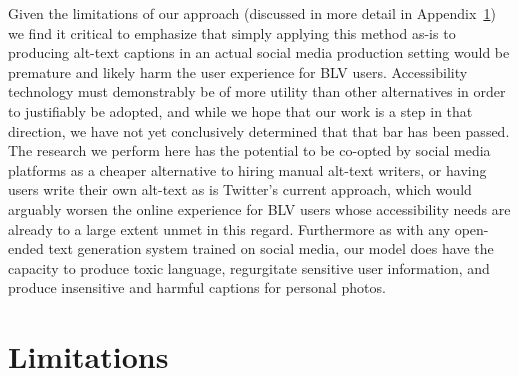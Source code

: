 \documentclass{article} %
\begin{document}
Given the limitations of our approach (discussed in more detail in Appendix~\ref{sec:limitations}) we find it critical to emphasize that simply applying this method as-is to producing alt-text captions in an actual social media production setting would be premature and likely harm the user experience for BLV users.
Accessibility technology must demonstrably be of more utility than other alternatives in order to justifiably be adopted, and while we hope that our work is a step in that direction, we have not yet conclusively determined that that bar has been passed.
The research we perform here has the potential to be co-opted by social media platforms as a cheaper alternative to hiring manual alt-text writers, or having users write their own alt-text as is Twitter's current approach, which would arguably worsen the online experience for BLV users whose accessibility needs are already to a large extent unmet in this regard.
Furthermore as with any open-ended text generation system trained on social media, our model does have the capacity to produce toxic language, regurgitate sensitive user information, and produce insensitive and harmful captions for personal photos.





\newpage
\appendix

\section{Limitations}
\label{sec:limitations}
\end{document}

